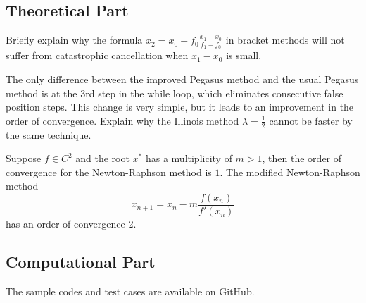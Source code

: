 \subsection{Theoretical Part}
\begin{problem}
Briefly explain why the formula $x_2 = x_0 - f_0 \frac{x_1 - x_0}{f_1 - f_0}$ in bracket methods will not suffer from catastrophic cancellation when $x_1 - x_0$ is small.
\end{problem}
\begin{problem}
The only difference between the improved Pegasus method and the usual Pegasus method is at the 3rd step in the while loop, which eliminates consecutive false position steps. This change is very simple, but it leads to an improvement in the order of convergence. Explain why the Illinois method $\lambda = \frac{1}{2}$ cannot be faster by the same technique.
\end{problem}
\begin{problem}
Suppose $f\in C^2$ and the root $x^{\ast}$ has a multiplicity of $m>1$, then the order of convergence for the Newton-Raphson method is $1$. The modified Newton-Raphson method
$$
x_{n+1} = x_n - m\frac{f(x_n)}{f'(x_n)}
$$
has an order of convergence $2$.
\end{problem}

\subsection{Computational Part}
The sample codes and test cases are available on GitHub. 

